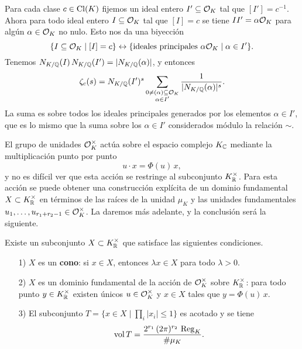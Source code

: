 Para cada clase $c \in \operatorname{Cl} (K)$ fijemos un ideal entero $I' \subseteq \mathcal{O}_K$
tal que $[I'] = c^{-1}$. Ahora para todo ideal entero $I \subseteq \mathcal{O}_K$ tal que
$[I] = c$ se tiene $I I' = \alpha \mathcal{O}_K$ para algún $\alpha \in \mathcal{O}_K$ no nulo.
Esto nos da una biyección
\[ \{ I \subseteq \mathcal{O}_K \mid [I] = c \} \leftrightarrow
\{ \text{ideales principales } \alpha\mathcal{O}_K \mid \alpha \in I' \}. \]
Tenemos $N_{K/\mathbb{Q}} (I) \, N_{K/\mathbb{Q}} (I') = |N_{K/\mathbb{Q}} (\alpha)|$, y entonces
$$\zeta_c (s) = N_{K/\mathbb{Q}} (I')^s \sum_{\substack{0 \ne (\alpha) \subseteq \mathcal{O}_K \\ \alpha \in I'}} \frac{1}{|N_{K/\mathbb{Q}} (\alpha)|^s}.$$
La suma es sobre todos los ideales principales generados por los elementos
$\alpha \in I'$, que es lo mismo que la suma sobre los $\alpha \in I'$ considerados
módulo la relación $\sim$.

\vspace{1em}

El grupo de unidades $\mathcal{O}_K^\times$ actúa sobre el espacio complejo $K_{\mathbb{C}}$
mediante la multiplicación punto por punto
$$u \cdot x = \Phi (u)\,x,$$
y no es difícil ver que esta acción se restringe al subconjunto
$K_{\mathbb{R}}^\times$. Para esta acción se puede obtener una construcción explícita de
un dominio fundamental $X \subset K_{\mathbb{R}}^\times$ en términos de las raíces de
la unidad $\mu_K$ y las unidades fundamentales
$u_1,\ldots,u_{r_1+r_2-1} \in \mathcal{O}_K^\times$. La daremos más adelante,
y la conclusión será la siguiente.

\begin{teorema}
  \label{thm:X-dominio-fundamental-de-OK*}
  Existe un subconjunto $X \subset K_{\mathbb{R}}^\times$ que satisface las siguientes
  condiciones.
  \begin{enumerate}
  \item[1)] $X$ es un \textbf{cono}: si $x \in X$, entonces $\lambda x \in X$
    para todo $\lambda > 0$.

  \item[2)] $X$ es un dominio fundamental de la acción de $\mathcal{O}_K^\times$ sobre
    $K_{\mathbb{R}}^\times$: para todo punto $y \in K_{\mathbb{R}}^\times$ existen únicos
    $u \in \mathcal{O}_K^\times$ y $x \in X$ tales que $y = \Phi (u)\,x$.

  \item[3)] El subconjunto $T = \{ x \in X \mid \prod_i |x_i| \le 1 \}$
    es acotado y se tiene
    \begin{equation}
      \label{eq:vol-T}
      \operatorname{vol} T = \frac{2^{r_1}\,(2\pi)^{r_2}\,\operatorname{Reg}_K}{\# \mu_K}.
    \end{equation}
  \end{enumerate}
\end{teorema}

